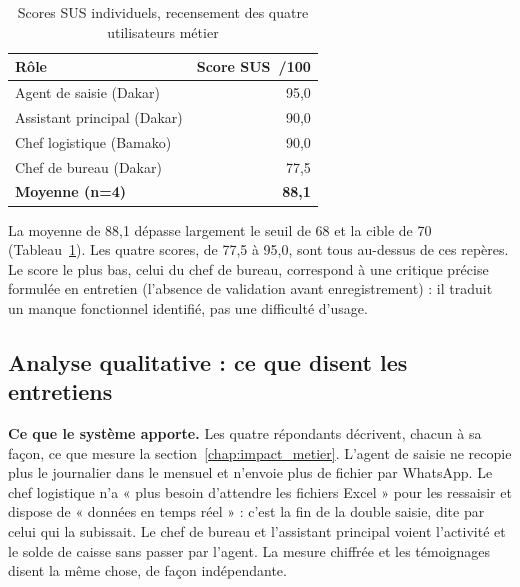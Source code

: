 \begin{table}[htbp]
\centering
\footnotesize
\caption{Scores SUS individuels, recensement des quatre utilisateurs métier}
\label{tab:adoption_sus}
\begin{tabular}{|l|r|}
\hline
\rowcolor[HTML]{EFEFEF}
\textbf{Rôle} & \textbf{Score SUS~/100} \\ \hline
Agent de saisie (Dakar) & 95,0 \\ \hline
Assistant principal (Dakar) & 90,0 \\ \hline
Chef logistique (Bamako) & 90,0 \\ \hline
Chef de bureau (Dakar) & 77,5 \\ \hline
\textbf{Moyenne (n=4)} & \textbf{88,1} \\ \hline
\end{tabular}
\end{table}

La moyenne de 88,1 dépasse largement le seuil de 68 et la cible de 70 (Tableau~\ref{tab:adoption_sus}). Les quatre scores, de 77,5 à 95,0, sont tous au-dessus de ces repères. Le score le plus bas, celui du chef de bureau, correspond à une critique précise formulée en entretien (l'absence de validation avant enregistrement) : il traduit un manque fonctionnel identifié, pas une difficulté d'usage.

\subsection{Analyse qualitative : ce que disent les entretiens}
\label{sec:adoption_qualitatif}

\textbf{Ce que le système apporte.} Les quatre répondants décrivent, chacun à sa façon, ce que mesure la section~\ref{chap:impact_metier}. L'agent de saisie ne recopie plus le journalier dans le mensuel et n'envoie plus de fichier par WhatsApp. Le chef logistique n'a « plus besoin d'attendre les fichiers Excel » pour les ressaisir et dispose de « données en temps réel » : c'est la fin de la double saisie, dite par celui qui la subissait. Le chef de bureau et l'assistant principal voient l'activité et le solde de caisse sans passer par l'agent. La mesure chiffrée et les témoignages disent la même chose, de façon indépendante.

